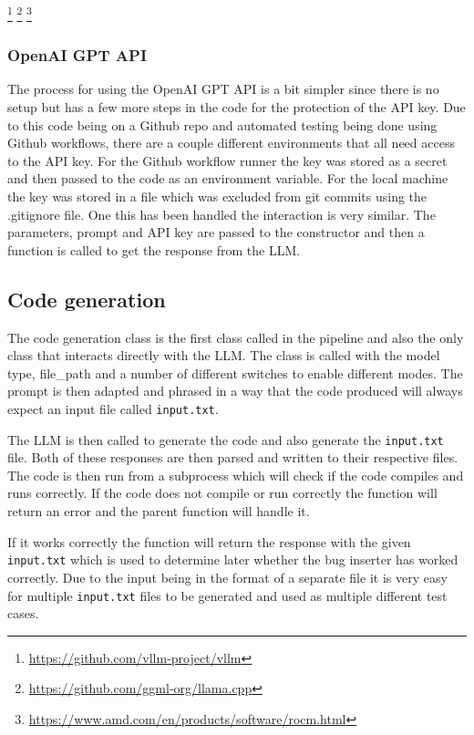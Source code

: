 \documentclass[12pt]{extarticle}
\begin{document}
\footnote{\url{https://github.com/vllm-project/vllm}}
\footnote{\url{https://github.com/ggml-org/llama.cpp}}
\footnote{\url{https://www.amd.com/en/products/software/rocm.html}}



\subsubsection{OpenAI GPT API}

The process for using the OpenAI GPT API is a bit simpler since there is no setup but has a few more steps in the code for the protection of the API key. Due to this code being on a Github repo and automated testing being done using Github workflows, there are a couple different environments that all need access to the API key. For the Github workflow runner the key was stored as a secret and then passed to the code as an environment variable. For the local machine the key was stored in a file which was excluded from git commits using the .gitignore file. One this has been handled the interaction is very similar. The parameters, prompt and API key are passed to the constructor and then a function is called to get the response from the LLM.

\subsection{Code generation}

The code generation class is the first class called in the pipeline and also the only class that interacts directly with the LLM. The class is called with the model type, file\_path and a number of different switches to enable different modes. The prompt is then adapted and phrased in a way that the code produced will always expect an input file called \texttt{input.txt}. 

The LLM is then called to generate the code and also generate the \texttt{input.txt} file. Both of these responses are then parsed and written to their respective files. The code is then run from a subprocess which will check if the code compiles and runs correctly. If the code does not compile or run correctly the function will return an error and the parent function will handle it. 

If it works correctly the function will return the response with the given \texttt{input.txt} which is used to determine later whether the bug inserter has worked correctly. Due to the input being in the format of a separate file it is very easy for multiple \texttt{input.txt} files to be generated and used as multiple different test cases. 
\end{document}
